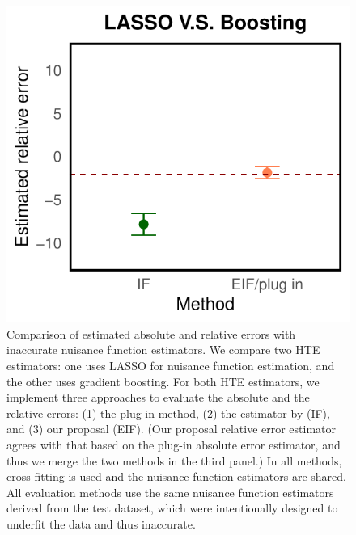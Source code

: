 \documentclass{article}
\theoremstyle{plain}
\theoremstyle{definition}
\theoremstyle{plain}
\begin{document}
\begin{figure}[h]
\begin{minipage}{0.3\textwidth}
        \end{minipage}
        \hspace{1cm}
            \begin{minipage}{0.3\textwidth}
                \centering
                \includegraphics[clip, trim = 0cm 0cm 0cm 0cm, width = \textwidth]{plot/inaccurate_nuisance_function_estimator_relative.pdf}
        \end{minipage}
        \caption{Comparison of estimated absolute and relative errors with inaccurate nuisance function estimators.
        We compare two HTE estimators: one uses LASSO for nuisance function estimation, and the other uses gradient boosting. 
        For both HTE estimators, we implement three approaches to evaluate the absolute and the relative errors: (1) the plug-in method, (2) the estimator by \cite{alaa2019validating} (IF), and (3) our proposal (EIF). 
        (Our proposal relative error estimator agrees with that based on the plug-in absolute error estimator, and thus we merge the two methods in the third panel.)
        In all methods, cross-fitting is used and the nuisance function estimators are shared. 
        All evaluation methods use the same nuisance function estimators derived from the test dataset, which were intentionally designed to underfit the data and thus inaccurate.
}
\end{figure}
\end{document}
